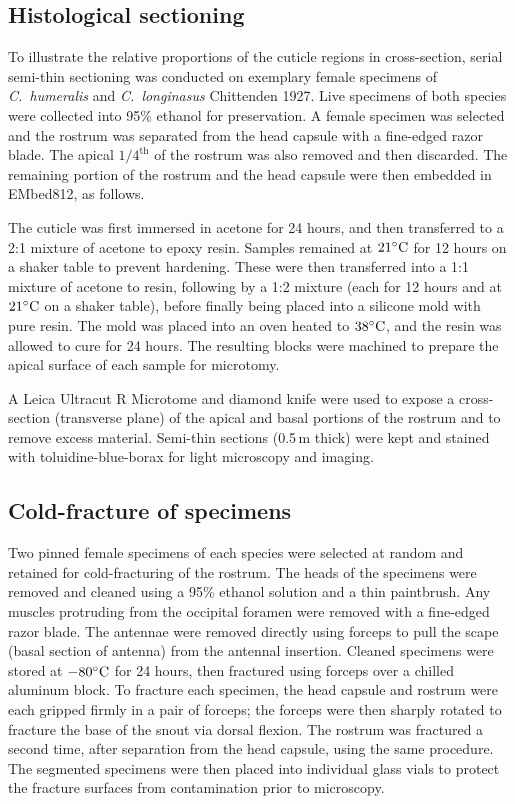 \documentclass[twocolumn, linenumbers, superscriptaddress, nofootinbib]{revtex4-1}
\begin{document}
		\subsection*{Histological sectioning}
			To illustrate the relative proportions of the cuticle regions in cross-section, serial semi-thin sectioning was conducted on exemplary female specimens of \textit{C.~humeralis} and \textit{C.~longinasus} Chittenden 1927.
			Live specimens of both species were collected into 95\% ethanol for
			preservation.
			A female specimen was selected and the rostrum was separated from the head capsule with a fine-edged razor blade.
			The apical $1/4^{\text{th}}$ of	the rostrum was also removed and then discarded.
			The remaining portion	of the rostrum and the head capsule were then embedded in EMbed812, as follows.
			
			The cuticle was first immersed in acetone for 24 hours, and then transferred to a 2:1 mixture of acetone to epoxy resin.
			Samples remained at $21\degree\text{C}$ for 12 hours on a shaker table to prevent hardening.
			These were then transferred into a 1:1 mixture of acetone to resin, following by a 1:2 mixture (each for 12 hours and at $21\degree\text{C}$ on a shaker table), before finally being placed into a silicone mold with pure resin.
			The mold was placed	into an oven heated to $38\degree\text{C}$, and the resin was allowed to cure for 24 hours.
			The resulting blocks were machined to prepare the apical surface of each
			sample for microtomy.
			
			A Leica Ultracut R Microtome and diamond knife were used to expose a cross-section (transverse plane) of the apical and basal portions of the rostrum and to remove excess material.
			Semi-thin sections (0.5\,{\textmu}m thick) were kept and stained with
			toluidine-blue-borax for light microscopy and imaging.
			
		\subsection*{Cold-fracture of specimens}
			Two pinned female specimens of each species were selected at random and retained for cold-fracturing of the rostrum.
			The heads of the specimens were removed and cleaned using a 95\% ethanol solution and a thin paintbrush.
			Any muscles protruding from the occipital foramen were removed with a fine-edged razor blade.
			The antennae were removed directly using forceps to pull the scape (basal section of antenna) from the antennal insertion.
			Cleaned specimens were stored at $-80\degree\text{C}$ for 24 hours, then fractured using forceps over a chilled aluminum block.
			To fracture each specimen, the head capsule and rostrum were each gripped firmly in a pair of forceps; the forceps were then sharply rotated to fracture the base of the snout via dorsal flexion.
			The rostrum was fractured a second time, after separation from the head capsule, using the same procedure.
			The segmented specimens were then placed into individual glass vials to protect the fracture surfaces from contamination prior to microscopy.
			
\end{document}
